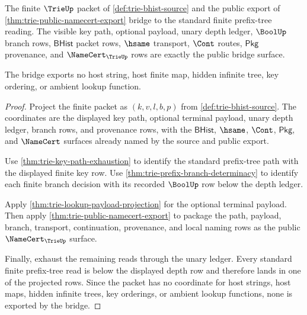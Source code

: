 \begin{theorem}\label{thm:trie-standard-finite-packet-bridge}
The finite $\TrieUp$ packet of \autoref{def:trie-bhist-source} and the public
export of \autoref{thm:trie-public-namecert-export} bridge to the standard
finite prefix-tree reading. The visible key path, optional payload, unary
depth ledger, $\BoolUp$ branch rows, $\mathsf{BHist}$ packet rows, $\hsame$
transport, $\Cont$ routes, $\mathsf{Pkg}$ provenance, and $\NameCert_{\TrieUp}$
rows are exactly the public bridge surface.

The bridge exports no host string, host finite map, hidden infinite tree, key
ordering, or ambient lookup function.
\end{theorem}
\begin{proof}
Project the finite packet as $(k,v,l,b,p)$ from
\autoref{def:trie-bhist-source}. The coordinates are the displayed key path,
optional terminal payload, unary depth ledger, branch rows, and provenance
rows, with the $\mathsf{BHist}$, $\hsame$, $\Cont$, $\mathsf{Pkg}$, and
$\NameCert$ surfaces already named by the source and public export.

Use \autoref{thm:trie-key-path-exhaustion} to identify the standard
prefix-tree path with the displayed finite key row. Use
\autoref{thm:trie-prefix-branch-determinacy} to identify each finite branch
decision with its recorded $\BoolUp$ row below the depth ledger.

Apply \autoref{thm:trie-lookup-payload-projection} for the optional terminal
payload. Then apply \autoref{thm:trie-public-namecert-export} to package the
path, payload, branch, transport, continuation, provenance, and local naming
rows as the public $\NameCert_{\TrieUp}$ surface.

Finally, exhaust the remaining reads through the unary ledger. Every standard
finite prefix-tree read is below the displayed depth row and therefore lands
in one of the projected rows. Since the packet has no coordinate for host
strings, host maps, hidden infinite trees, key orderings, or ambient lookup
functions, none is exported by the bridge.
\end{proof}

